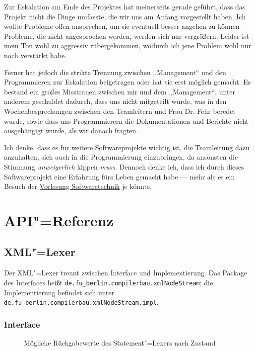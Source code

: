 \documentclass[10pt,a4paper,ngerman,titlepage,tocindentauto]{scrartcl}
\newcommand{\n}{\linebreak[1]}
\begin{document}
		Zur Eskalation am Ende des Projektes hat meinerseits gerade geführt, dass das Projekt nicht die Dinge umfasste,
		die wir uns am Anfang vorgestellt haben. Ich wollte Probleme offen ansprechen, um sie eventuell besser angehen zu
		können -- Probleme, die nicht angesprochen werden, werden sich nur vergrößern. Leider ist mein Ton wohl zu aggressiv
		rübergekommen, wodurch ich jene Problem wohl nur noch verstärkt habe.
		
		Ferner hat jedoch die strikte Trennung zwischen ,,Management`` und den Programmieren zur Eskalation beigetragen
		oder hat sie erst möglich gemacht. Es bestand ein großes Misstrauen zwischen mir und dem ,,Management``,
		unter anderem geschuldet dadurch, dass uns nicht mitgeteilt wurde, was in den Wochenbesprechungen zwischen den
		Teamleitern und Frau Dr. Fehr beredet wurde, sowie dass uns Programmierern die Dokumentationen und Berichte
		nicht ausgehängigt wurde, als wir danach fragten.
		
		Ich denke, dass es für weitere Softwareprojekte wichtig ist, die Teamleitung dazu anzuhalten, sich auch in die
		Programmierung einzubringen, da ansonsten die Stimmung {\em unweigerlich} kippen {\em muss}. Dennoch denke ich,
		dass ich durch dieses Softwareprojekt eine Erfahrung fürs Leben gemacht habe --- mehr als es ein Besuch der
		\href{https://www.inf.fu-berlin.de/w/SE/VorlesungSoftwaretechnik2008}{Vorlesung Softwaretechnik} je könnte.
		
	\section{API"=Referenz}
		\subsection[XML-Lexer]{\hypertarget{XML-Lexer-API}{XML"=Lexer}}
			Der XML"=Lexer trennt zwischen Interface und Implementierung.
			Das Package des Interfaces heißt \texttt{de.{\n}fu\_berlin.{\n}compilerbau.{\n}xmlNodeStream};
			die Implementierung befindet sich unter \texttt{de.{\n}fu\_berlin.{\n}compilerbau.{\n}xmlNodeStream.{\n}impl}.
			
			\subsubsection*{Interface}
				\begin{wrapfigure}{R}{0.3\textwidth}
					\caption{Mög\-li\-che Rück\-ga\-be\-wer\-te des State\-ment"=Le\-xers nach Zu\-stand}
				\end{wrapfigure}
				
\end{document}
